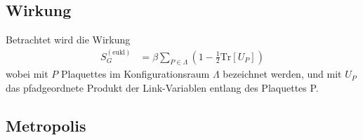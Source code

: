 

\subsection{Wirkung}

Betrachtet wird die Wirkung
\begin{align*}
  S_G^{(\textrm{eukl})} &= \beta \sum_{P \in \Lambda} \left(1-\frac{1}{2} \textrm{Tr} \left[ U_P \right] \right)
\end{align*}
wobei mit $P$ Plaquettes im Konfigurationsraum $\Lambda$ bezeichnet werden, und mit $U_P$ das pfadgeordnete Produkt der Link-Variablen entlang des Plaquettes P.

\subsection{Metropolis}





